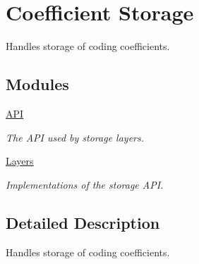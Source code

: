 \hypertarget{group__coefficient__storage}{\section{Coefficient Storage}
\label{group__coefficient__storage}
}


Handles storage of coding coefficients.  


\subsection*{Modules}
\begin{DoxyCompactItemize}
\item 
\hyperlink{group__coefficient__storage__api}{A\-P\-I}
\begin{DoxyCompactList}\small\item\em The A\-P\-I used by storage layers. \end{DoxyCompactList}\item 
\hyperlink{group__coefficient__storage__layers}{Layers}
\begin{DoxyCompactList}\small\item\em Implementations of the storage A\-P\-I. \end{DoxyCompactList}\end{DoxyCompactItemize}


\subsection{Detailed Description}
Handles storage of coding coefficients. 